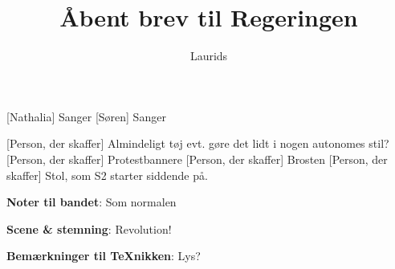 \documentclass[a4paper,11pt]{article}
\title{Åbent brev til Regeringen}
\author{Laurids}
\begin{document}
\maketitle

\begin{roles}
    [Nathalia] Sanger
    [Søren] Sanger
\end{roles}

\begin{props}
    [Person, der skaffer] Almindeligt tøj evt. gøre det lidt i nogen autonomes stil?
    [Person, der skaffer] Protestbannere
    [Person, der skaffer] Brosten
    [Person, der skaffer] Stol, som S2 starter siddende på.
\end{props}

\scene \textbf{Noter til bandet}: Som normalen

\scene \textbf{Scene \& stemning}: Revolution! 

\scene \textbf{Bemærkninger til TeXnikken}: Lys? 
\end{document}
